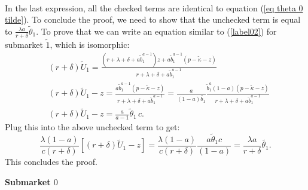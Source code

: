 \documentclass[12pt]{article} %
\theoremstyle{definition}
\begin{document}
\begin{appendix}
\begin{align*}
\end{align*}
In the last expression, all the checked terms are identical to equation (\ref{eq theta 0 tilde}). To conclude the proof, we need to show that the unchecked term is equal to $\frac{\lambda a}{r+\delta} \tilde{\theta}_1.$ To prove that we can write an equation similar to (\ref{label02}) for submarket $\tilde{1}$, which is isomorphic:
\begin{align*}
& (r+\delta) \tilde{U}_1 = \frac{(r+\lambda+\delta+a \tilde{b}_1^{a-1})z + a \tilde{b}_1^{a-1}(p-\tilde{\kappa}-z)}{r+\lambda+\delta+a \tilde{b}_1^{a-1}} \\
& (r+\delta) \tilde{U}_1 - z = \frac{a \tilde{b}_1^{a-1}(p-\tilde{\kappa}-z)}{r+\lambda+\delta+a \tilde{b}_1^{a-1}} = \frac{a}{(1-a)\tilde{b_1}} \frac{\tilde{b}_1^{a}(1-a)(p-\tilde{\kappa}-z)}{r+\lambda+\delta+a \tilde{b}_1^{a-1}} \\
& (r+\delta) \tilde{U}_1 - z = \frac{a}{a-1}\tilde{\theta}_1 \, c. 
\end{align*}
Plug this into the above unchecked term to get: 
$$\frac{\lambda(1-a)}{c(r+\delta)}[(r+\delta)\tilde{U}_1 - z]=\frac{\lambda(1-a)}{c(r+\delta)}\frac{a \tilde{\theta}_1c}{(1-a)}=\frac{\lambda a}{r+\delta}\tilde{\theta_1}.$$This concludes the proof. 

\medskip 

\noindent \textbf{Submarket $0$}

\medskip


\end{appendix}
\end{document}
